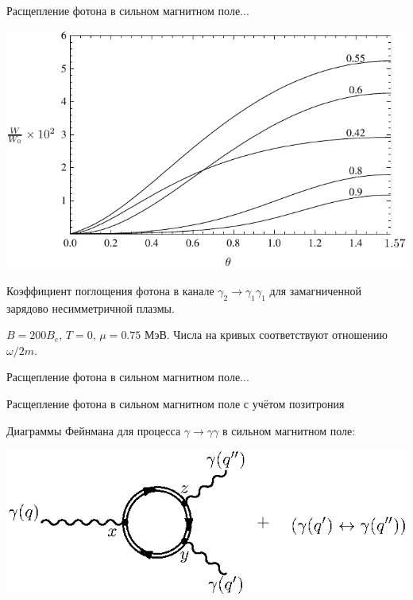 \documentclass{beamer}
\begin{document}
\begin{frame}{Расщепление фотона в сильном магнитном поле...}
\begin{center}

\includegraphics[scale=0.7]{3_4.pdf}

Коэффициент поглощения фотона в канале $\gamma_2 \to\gamma_1 \gamma_1$ для замагниченной зарядово несимметричной плазмы.

$B = 200B_e$, $T=0$, $\mu = 0.75$ МэВ.
Числа на кривых соответствуют отношению  $\omega / 2 m$.

\end{center}
\end{frame}
\begin{frame}{Расщепление фотона в сильном магнитном поле...}
\begin{center}
\alert{Расщепление фотона в сильном магнитном поле с учётом позитрония}

\vspace{3mm}

Диаграммы Фейнмана для процесса $\gamma\to\gamma\gamma$ в сильном магнитном поле:

\vspace{3mm}

\includegraphics[scale=1]{fig3_1.eps}

\end{center}
\end{frame}
\end{document}
